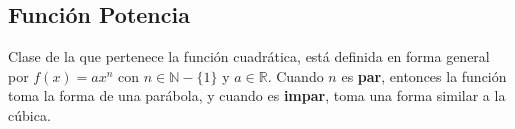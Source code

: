 \subsection{Función Potencia}
Clase de la que pertenece la función cuadrática, está definida en forma general por $f(x) = ax^n$ con $n \in \mathbb{N} - \{1\}$ y $a \in \mathbb{R}$.
Cuando $n$ es \textbf{par}, entonces la función toma la forma de una parábola, y cuando es \textbf{impar}, toma una forma similar a la cúbica.
